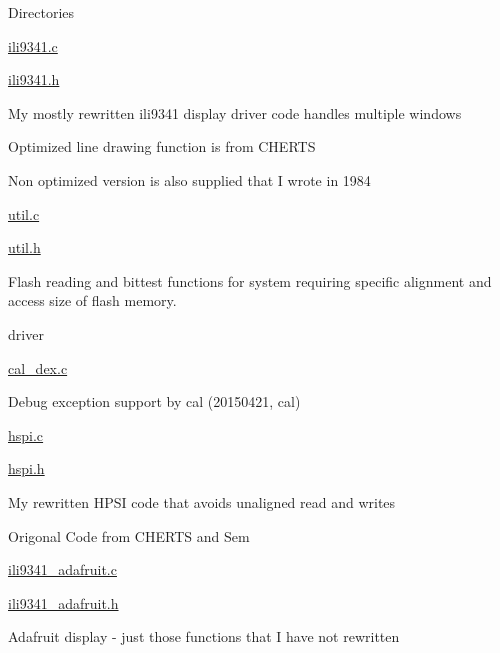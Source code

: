 \begin{DoxyParagraph}{Directories}
\begin{DoxyItemize}
\begin{DoxyItemize}
\item \hyperlink{ili9341_8c}{ili9341.\-c}
\item \hyperlink{ili9341_8h}{ili9341.\-h}
\begin{DoxyItemize}
\item My mostly rewritten ili9341 display driver code handles multiple windows
\begin{DoxyItemize}
\item Optimized line drawing function is from C\-H\-E\-R\-T\-S
\item Non optimized version is also supplied that I wrote in 1984
\end{DoxyItemize}
\end{DoxyItemize}
\item \hyperlink{util_8c}{util.\-c}
\item \hyperlink{util_8h}{util.\-h}
\begin{DoxyItemize}
\item Flash reading and bittest functions for system requiring specific alignment and access size of flash memory.
\end{DoxyItemize}
\end{DoxyItemize}
\item driver
\begin{DoxyItemize}
\item \hyperlink{cal__dex_8c}{cal\-\_\-dex.\-c}
\begin{DoxyItemize}
\item Debug exception support by cal (20150421, cal)
\end{DoxyItemize}
\item \hyperlink{hspi_8c}{hspi.\-c}
\item \hyperlink{hspi_8h}{hspi.\-h}
\begin{DoxyItemize}
\item My rewritten H\-P\-S\-I code that avoids unaligned read and writes
\item Origonal Code from C\-H\-E\-R\-T\-S and Sem
\end{DoxyItemize}
\item \hyperlink{ili9341__adafruit_8c}{ili9341\-\_\-adafruit.\-c}
\item \hyperlink{ili9341__adafruit_8h}{ili9341\-\_\-adafruit.\-h}
\begin{DoxyItemize}
\item Adafruit display -\/ just those functions that I have not rewritten
\end{DoxyItemize}
\end{DoxyItemize}
\end{DoxyItemize}
\end{DoxyParagraph}

